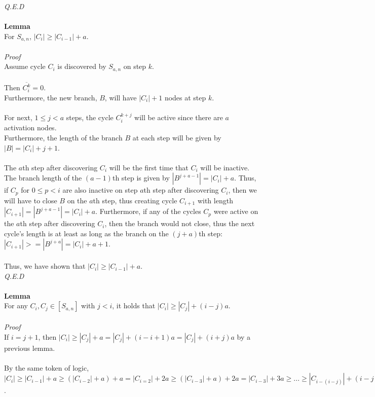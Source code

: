 \documentclass[a4paper,12pt]{article}
\begin{document}
\textit{Q.E.D}\\
\\
\textbf{Lemma}\\
For $S_{a,n}$, $|C_{i}| \geq |C_{i-1}| + a$.\\
\\
\textit{Proof}\\  
Assume cycle $C_i$ is discovered by $S_{a,n}$ on step $k$.\\
\\
Then $\overline{C^k_i} = 0$.\\
Furthermore, the new branch, $B$, will have $|C_i| + 1$ nodes at step $k$.\\
\\
For next, $1 \leq j < a$ steps, the cycle  $C^{k+j}_i$ will be active since there are $a$ activation nodes.\\
Furthermore, the length of the branch $B$ at each step will be given by $|B| = |C_i| + j + 1$.\\
\\
The $a$th step after discovering $C_i$ will be the first time that $C_i$ will be inactive. The branch length of the $(a-1)$th step is given by $|B^{j + a - 1}| = |C_i| + a$. Thus, if $C_p$ for $0 \leq p < i$ are also inactive on step $a$th step after discovering $C_i$, then we will have to close $B$ on the $a$th step, thus creating cycle $C_{i+1}$ with length $|C_{i+1}| = |B^{j + a - 1}| = |C_i| + a$. Furthermore, if any of the cycles $C_p$ were active on the $a$th step after discovering $C_i$, then the branch would not close, thus the next cycle's length is at least as long as the branch on the $(j+a)$th step: $|C_{i+1}| >= |B^{j + a}| = |C_i| + a + 1$.\\
\\
Thus, we have shown that  $|C_{i}| \geq |C_{i-1}| + a$.\\
\textit{Q.E.D}\\
\\
\textbf{Lemma}\\
For any $C_i, C_j \in [S_{a,n}]$ with $j < i$, it holds that $|C_{i}| \geq |C_j| + (i - j)a$.\\
\\
\textit{Proof}\\ 
If $i = j + 1$, then $|C_i| \geq |C_j| + a = |C_j| + (i - i + 1)a = |C_j| + (i + j)a$ by a previous lemma.\\
\\
By the same token of logic, $|C_i| \geq |C_{i-1}| + a \geq (|C_{i-2}| + a) + a = |C_{i=2}| + 2a \geq (|C_{i-3}| + a) + 2a = |C_{i-3}| + 3a \geq ... \geq |C_{i-(i - j)}| + (i-j)a = |C_j| + (i-j)a$.\\
\end{document}
